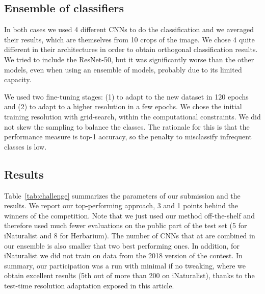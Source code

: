 \subsection{Ensemble of classifiers}

In both cases we used 4 different CNNs to do the classification and we averaged their results, which are themselves from 10 crops of the image. 
We chose 4 quite different in their architectures in order to obtain orthogonal classification results.
We tried to include the ResNet-50, but it was significantly worse than the other models, even when using an ensemble of models, probably due to its limited capacity. 

We used two fine-tuning stages: (1) to adapt to the new dataset in 120 epochs and (2) to adapt to a higher resolution in a few epochs. 
We chose the initial training resolution with grid-search, within the computational constraints. 
We did not skew the sampling to balance the classes. 
The rationale for this is that the performance measure is top-1 accuracy, so the penalty to misclassify infrequent classes is low.

\subsection{Results}

Table~\ref{tab:challenge} summarizes the parameters of our submission and the results. 
We report our top-performing approach, 3 and 1 points behind the winners of the competition. 
Note that we just used our method off-the-shelf and therefore used much fewer evaluations on the public part of the test set (5 for iNaturalist and 8 for Herbarium). 
The number of CNNs that at are combined in our ensemble is also smaller that two best performing ones.
In addition, for iNaturalist we did not train on data from the 2018 version of the contest.
In summary, our participation was a run with minimal if no tweaking, where we obtain excellent results (5th out of more than 200 on iNaturalist), thanks to the test-time resolution adaptation exposed in this article.







